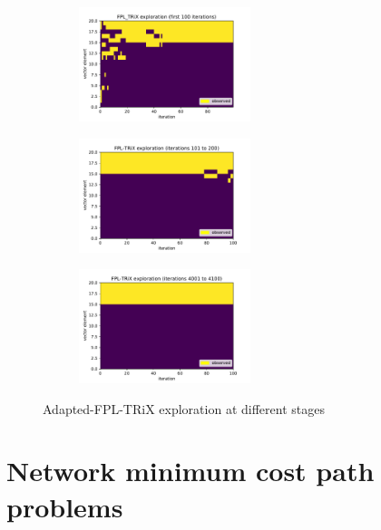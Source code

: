 \begin{figure}[h!]
\centering
\begin{subfigure}{.33\textwidth}
  \centering
  \includegraphics[width=50mm]{../plots/basicFPL_100iters.pdf}
\end{subfigure}%
\begin{subfigure}{.33\textwidth}
  \centering
  \includegraphics[width=50mm]{../plots/basicFPL_100_200iters.pdf}
\end{subfigure}
\begin{subfigure}{.33\textwidth}
  \centering
  \includegraphics[width=50mm]{../plots/basicFPL_4000_4100iters.pdf}
\end{subfigure}
\caption{Adapted-FPL-TRiX exploration at different stages}
\label{fig:ullm-particle}
\end{figure}






\pagebreak


\section{Network minimum cost path problems}

